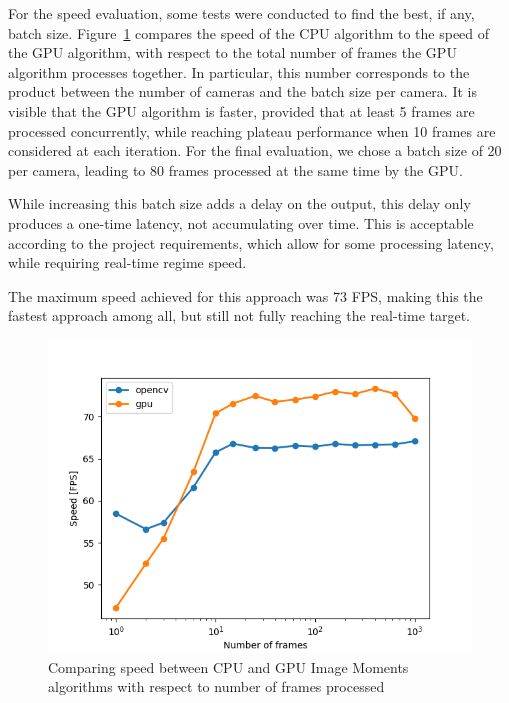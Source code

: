 For the speed evaluation, some tests were conducted to find the best, if any, batch size.
Figure~\ref{fig:locate:moments-cpu-vs-gpu} compares the speed of the CPU algorithm to the speed of the GPU algorithm, with respect to the total number of frames the GPU algorithm processes together.
In particular, this number corresponds to the product between the number of cameras and the batch size per camera.
It is visible that the GPU algorithm is faster, provided that at least 5 frames are processed concurrently, while reaching plateau performance when 10 frames are considered at each iteration.
For the final evaluation, we chose a batch size of 20 per camera, leading to 80 frames processed at the same time by the GPU.

While increasing this batch size adds a delay on the output, this delay only produces a one-time latency, not accumulating over time.
This is acceptable according to the project requirements, which allow for some processing latency, while requiring real-time regime speed.

The maximum speed achieved for this approach was 73 FPS, making this the fastest approach among all, but still not fully reaching the real-time target.

\begin{figure}
	\centerline{\includegraphics[width=.6\textwidth]{images/moments_opencv_vs_gpu.png}}
	\caption{\centering Comparing speed between CPU and GPU Image Moments algorithms with respect to number of frames processed}
	\label{fig:locate:moments-cpu-vs-gpu}
\end{figure}
